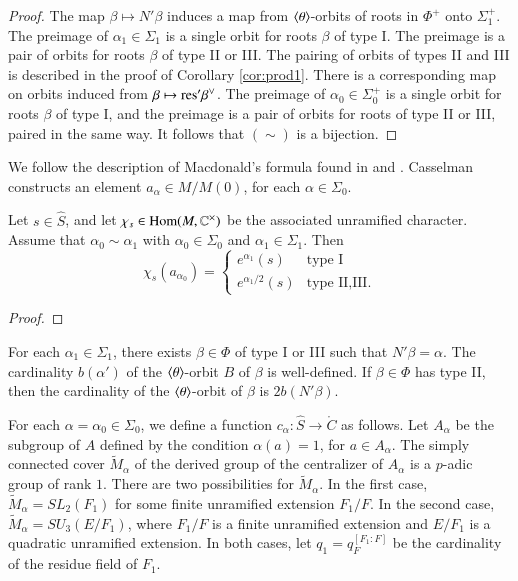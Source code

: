 \begin{proof} 
The map $\beta\mapsto N'\beta$ induces a map from $\langle{\theta}\rangle$-orbits of roots in $\Phi^+$
onto $\Sigma^+_1$.  The preimage of $\alpha_1\in\Sigma_1$
is a single orbit for roots $\beta$ of type I.  The preimage
is a pair of orbits for roots $\beta$ of type II or III.  The pairing of orbits of types II and III is
described in the proof of Corollary \ref{cor:prod1}.
There is a corresponding map on orbits induced from $\beta\mapsto {\operatorname{res}}'\beta^\vee$.
The preimage of $\alpha_0\in\Sigma^+_0$ is a single orbit for roots $\beta$ of type I, and the preimage is a pair of
orbits for roots of type II or III, paired in the same way.  It follows that $(\sim)$ is a bijection.
\end{proof}

We follow the description of Macdonald's formula 
found in \cite{casselman1980unramified} and \cite{casselman2005companion}.
Casselman constructs an element $a_{\alpha}\in M/M(0)$, for each $\alpha\in\Sigma_0$.

\begin{lemma} Let $s\in \hat S$, and let $\chi_s\in{\operatorname{Hom}}(M,\mathbb{C}^\times)$ be the associated
unramified character.  Assume that $\alpha_0\sim\alpha_1$ with $\alpha_0\in\Sigma_0$ and $\alpha_1\in\Sigma_1$.
Then
\[
\chi_s(a_{\alpha_0}) = \begin{cases}
e^{\alpha_1} (s) & \text{type I}\\
e^{\alpha_1/2}(s) & \text{type II,III}.
\end{cases}
\]
\end{lemma}

\begin{proof} 
\end{proof}




For each $\alpha_1\in\Sigma_1$, there exists $\beta\in\Phi$ of
type I or III such that $N'\beta = \alpha$.  The cardinality $b(\alpha')$
of the $\langle{\theta}\rangle$-orbit $B$ of $\beta$ is well-defined.  If $\beta\in\Phi$ has type II,
then the cardinality of the $\langle{\theta}\rangle$-orbit of $\beta$ is $2b(N'\beta)$.

For each $\alpha=\alpha_0\in\Sigma_0$, we define
 a function $c_{\alpha}:\hat S\to\ring{C}$ as  follows.
Let $A_{\alpha}$ be the subgroup of $A$ defined by the condition $\alpha(a)=1$, for $a\in A_\alpha$.
The simply connected cover $\tilde M_\alpha$ of the derived group of the centralizer of $A_\alpha$ is a $p$-adic
group of rank $1$.  There are two possibilities for $\tilde M_\alpha$.  In the first case, $\tilde M_\alpha = SL_2(F_1)$ for
some finite unramified extension $F_1/F$.  In the second case, $\tilde M_\alpha = SU_3(E/F_1)$, where $F_1/F$ is 
a finite unramified extension and $E/F_1$ is a quadratic unramified extension.  In both cases, 
let $q_1 = q_F^{[F_1:F]}$ be the cardinality
of the residue field of $F_1$.

